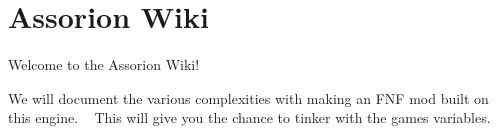 \chapter{Assorion Wiki}
\hypertarget{md_documents_2README}{}\label{md_documents_2README}
\label{md_documents_2README_autotoc_md0}%
%
 Welcome to the Assorion Wiki!

We will document the various complexities with making an FNF mod built on this engine. ~\newline
 This will give you the chance to tinker with the game\textquotesingle{}s variables. 